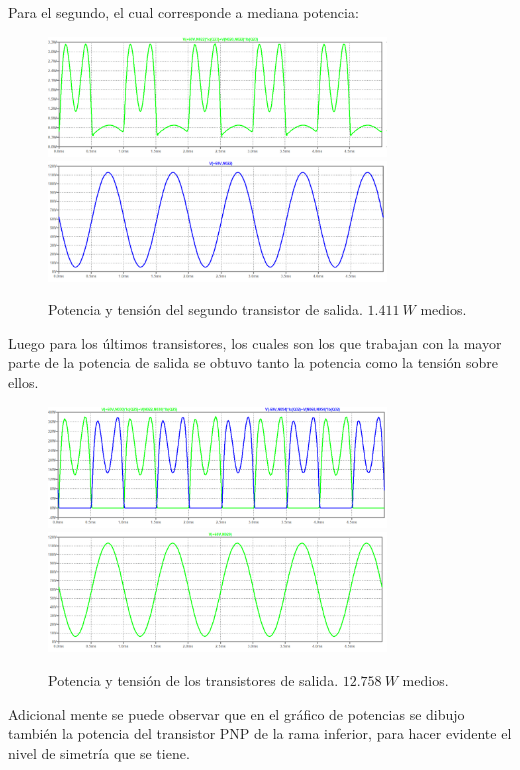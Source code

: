 Para el segundo, el cual corresponde a mediana potencia:
\begin{figure}[H]
	\centering
	\includegraphics[width=0.8\textwidth]{ImagenesSimulaciones/PO2.png}
		\includegraphics[width=0.8\textwidth]{ImagenesSimulaciones/VO2.png}
	\caption{Potencia y tensión del segundo transistor de salida. $1.411 \ W$ medios.}
	\label{fig:po2}
\end{figure}
Luego para los últimos transistores, los cuales son los que trabajan con la mayor parte de la potencia de salida se obtuvo tanto la potencia como la tensión sobre ellos.
\begin{figure}[H]
	\centering
	\includegraphics[width=0.8\textwidth]{ImagenesSimulaciones/PO3.png}
		\includegraphics[width=0.8\textwidth]{ImagenesSimulaciones/VO3.png}
	\caption{Potencia y tensión de los transistores de salida. $12.758 \ W$ medios.}
	\label{fig:po3}
\end{figure}
Adicional mente se puede observar que en el gráfico de potencias se dibujo también la potencia del transistor PNP de la rama inferior, para hacer evidente el nivel de simetría que se tiene.

